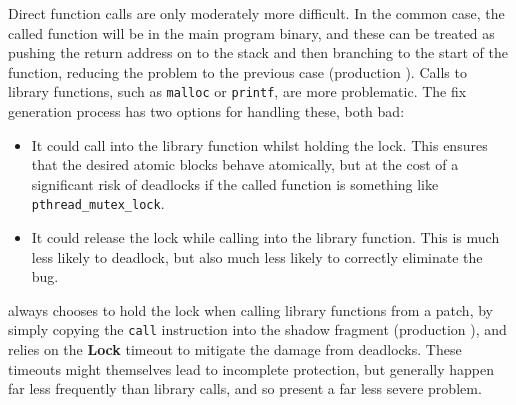 Direct function calls are only moderately more difficult.  In the
common case, the called function will be in the main program binary,
and these can be treated as pushing the return address on to the stack
and then branching to the start of the function, reducing the problem
to the previous case (production ).  Calls to library
functions, such as \texttt{malloc} or \texttt{printf}, are more
problematic.  The fix generation process has two options for handling
these, both bad:
\begin{itemize}
\item It could call into the library function whilst holding the lock.
  This ensures that the desired atomic blocks behave atomically, but
  at the cost of a significant risk of deadlocks if the called
  function is something like \texttt{pthread\_mutex\_lock}.
\item It could release the lock while calling into the library
  function.  This is much less likely to deadlock, but also much
  less likely to correctly eliminate the bug.
\end{itemize}
{\Implementation} always chooses to hold the lock when calling library
functions from a patch, by simply copying the \texttt{call}
instruction into the shadow fragment (production ), and
relies on the \textbf{Lock} timeout to mitigate the damage from
deadlocks.  These timeouts might themselves lead to incomplete
protection, but generally happen far less frequently than library
calls, and so present a far less severe problem.


